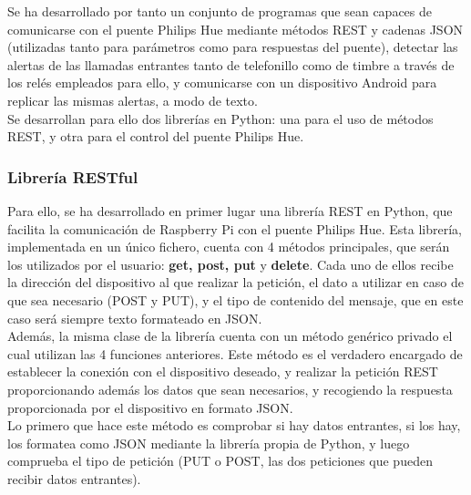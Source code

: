         Se ha desarrollado por tanto un conjunto de programas que sean capaces de comunicarse con el puente Philips Hue mediante métodos REST y cadenas JSON (utilizadas tanto para parámetros como para respuestas del puente), detectar las alertas de las llamadas entrantes tanto de telefonillo como de timbre a través de los relés empleados para ello, y comunicarse con un dispositivo Android para replicar las mismas alertas, a modo de texto. \\
        
        Se desarrollan para ello dos librerías en Python: una para el uso de métodos REST, y otra para el control del puente Philips Hue. \\

        \subsubsection{Librería RESTful}

        Para ello, se ha desarrollado en primer lugar una librería REST en Python, que facilita la comunicación de Raspberry Pi con el puente Philips Hue. Esta librería, implementada en un único fichero, cuenta con 4 métodos principales, que serán los utilizados por el usuario: \textbf{get, post, put} y \textbf{delete}. Cada uno de ellos recibe la dirección del dispositivo al que realizar la petición, el dato a utilizar en caso de que sea necesario (POST y PUT), y el tipo de contenido del mensaje, que en este caso será siempre texto formateado en JSON. \\

        \vspace{0.3cm}
        Además, la misma clase de la librería cuenta con un método genérico privado el cual utilizan las 4 funciones anteriores. Este método es el verdadero encargado de establecer la conexión con el dispositivo deseado, y realizar la petición REST proporcionando además los datos que sean necesarios, y recogiendo la respuesta proporcionada por el dispositivo en formato JSON. \\

        \vspace{0.3cm}
        Lo primero que hace este método es comprobar si hay datos entrantes, si los hay, los formatea como JSON mediante la librería propia de Python, y luego comprueba el tipo de petición (PUT o POST, las dos peticiones que pueden recibir datos entrantes). \\

